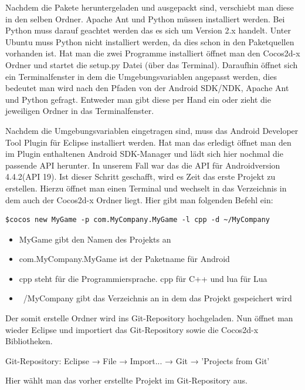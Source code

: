 Nachdem die Pakete heruntergeladen und ausgepackt sind, verschiebt man diese in den selben Ordner. Apache Ant und Python müssen installiert werden. Bei Python muss darauf geachtet werden das es sich um Version 2.x handelt. Unter Ubuntu muss Python nicht installiert werden, da dies schon in den Paketquellen vorhanden ist. 
Hat man die zwei Programme installiert öffnet man den Cocos2d-x Ordner und startet die setup.py Datei (über das Terminal). Daraufhin öffnet sich ein Terminalfenster in dem die Umgebungsvariablen angepasst werden, dies bedeutet man wird nach den Pfaden von der Android SDK/NDK, Apache Ant und Python gefragt. Entweder man gibt diese per Hand ein oder zieht die jeweiligen Ordner in das Terminalfenster. 



\label{sec:2_IDE}

Nachdem die Umgebungsvariablen eingetragen sind, muss das Android Developer Tool Plugin für Eclipse installiert werden. Hat man das erledigt öffnet man den im Plugin enthaltenen Android SDK-Manager und lädt sich hier nochmal die passende API herunter. In unserem Fall war das die API für Androidversion 4.4.2(API 19). 
Ist dieser Schritt geschafft, wird es Zeit das erste Projekt zu erstellen.
Hierzu öffnet man einen Terminal und wechselt in das Verzeichnis in dem auch der Cocos2d-x Ordner liegt. Hier gibt man folgenden Befehl ein:
	
\begin{lstlisting}[style=singleline]
	$cocos new MyGame -p com.MyCompany.MyGame -l cpp -d ~/MyCompany
\end{lstlisting}
		
\begin{itemize}
\item MyGame gibt den Namen des Projekts an
\item com.MyCompany.MyGame ist der Paketname für Android
\item cpp steht für die Programmiersprache. cpp für C++ und lua für Lua
\item ~/MyCompany gibt das Verzeichnis an in dem das Projekt gespeichert wird 
\end{itemize}

Der somit erstelle Ordner wird ins Git-Repository hochgeladen. 
Nun öffnet man wieder Eclipse und importiert das Git-Repository sowie die Cocos2d-x Bibliotheken. 

	Git-Repository: Eclipse → File → Import... → Git → 'Projects from Git'

Hier wählt man das vorher erstellte Projekt im Git-Repository aus.

